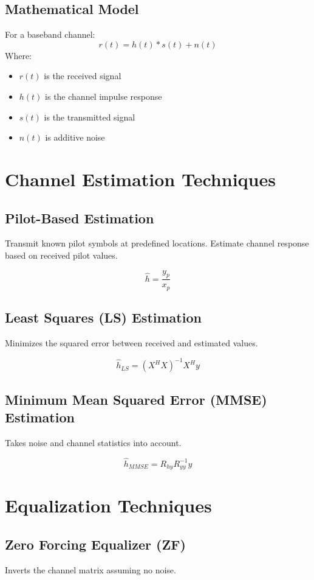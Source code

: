 \subsection{Mathematical Model}
For a baseband channel:
\[
r(t) = h(t) * s(t) + n(t)
\]
Where:
\begin{itemize}
  \item $r(t)$ is the received signal
  \item $h(t)$ is the channel impulse response
  \item $s(t)$ is the transmitted signal
  \item $n(t)$ is additive noise
\end{itemize}

\section{Channel Estimation Techniques}

\subsection{Pilot-Based Estimation}
Transmit known pilot symbols at predefined locations. Estimate channel response based on received pilot values.

\[
\hat{h} = \frac{y_p}{x_p}
\]

\subsection{Least Squares (LS) Estimation}
Minimizes the squared error between received and estimated values.

\[
\hat{h}_{LS} = (X^H X)^{-1} X^H y
\]

\subsection{Minimum Mean Squared Error (MMSE) Estimation}
Takes noise and channel statistics into account.

\[
\hat{h}_{MMSE} = R_{hy} R_{yy}^{-1} y
\]

\section{Equalization Techniques}

\subsection{Zero Forcing Equalizer (ZF)}
Inverts the channel matrix assuming no noise.

